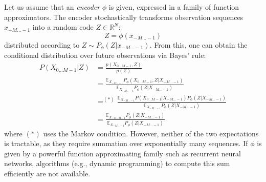 \documentclass[11pt,letterpaper]{article}
\newcommand{\E}[0]{\mathbb{E}}
\newif \ifcomment
\newcommand\rljf[1]{\ifcomment{{\color{blue}(#1)}}\else{}\fi}
\begin{document}
Let us assume that an \emph{encoder} $\phi$ is given, expressed in a family of function approximators. %
The encoder stochastically transforms observation sequences $x_{-M\dots -1}$ into a random code $Z \in \mathbb{R}^N$: \rljf{Slight mismatch of the math and the prose here: the prose makes it sound like $\phi$ is going to be a function from $x_{-M\dots -1}$ to $Z$ but in the math it returns a probability mass/density function. Maybe write as Z = \phi($x_{-M\dots -1}$), P_\phi(Z|$x_{-M\dots -1}$) = ...}
\begin{equation}
Z = \phi(x_{-M\dots -1})
\end{equation}
distributed according to $Z \sim P_\phi(Z|x_{-M\dots -1})$.
From this, one can obtain the conditional distribution over future observations via Bayes' rule: %
%
\begin{equation}
	\label{eq:cond-fut}
	\begin{split}
	P(X_{0\dots M-1}|Z) &= \frac{p(X_{0\dots M-1}, Z)}{p(Z)} \\
	&= \frac{\E_{X_{-M \dots -1}} P_\phi(X_{0\dots M-1}, Z|X_{-M\dots-1})}{\E_{X_{-M \dots -1}} P_\phi(Z|X_{-M \dots -1})} \\
	&=^{(*)} \frac{\E_{X_{-M \dots -1}}   P(X_{0\dots M-1}|X_{-M\dots-1})     P_\phi(Z|X_{-M\dots-1})}{\E_{X_{-M \dots -1}} P_\phi(Z|X_{-M \dots -1})} \\
	&= \frac{\E_{X_{-M \dots M-1}} P_\phi(Z|X_{-M\dots-1})}{\E_{X_{-M \dots -1}} P_\phi(Z|X_{-M \dots -1})}
	\end{split}
\end{equation}
where $(*)$ uses the Markov condition.
However, neither of the two expectations is tractable,  as they require summation over exponentially many sequences.
If $\phi$ is given by a powerful function approximating family such as recurrent neural networks, algorithms (e.g., dynamic programming) to compute this sum efficiently are not available.
\end{document}
